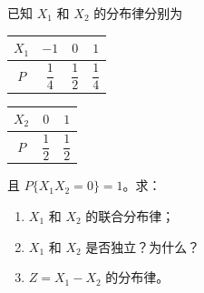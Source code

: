 \documentclass[lang=cn,11pt]{elegantbook}
\begin{document}
\begin{exercise}[联合分布的确定与独立性] \label{exer:3-3b}
已知 $X_1$ 和 $X_2$ 的分布律分别为
\begin{center}
\begin{tabular}{c|ccc}
$X_1$ & $-1$ & $0$ & $1$ \\
\midrule
$P$ & $\dfrac{1}{4}$ & $\dfrac{1}{2}$ & $\dfrac{1}{4}$
\end{tabular}
\quad
\begin{tabular}{c|cc}
$X_2$ & $0$ & $1$ \\
\midrule
$P$ & $\dfrac{1}{2}$ & $\dfrac{1}{2}$
\end{tabular}
\end{center}
且 $P\{X_1 X_2 = 0\} = 1$。求：
\begin{enumerate}
    \item[(1)] $X_1$ 和 $X_2$ 的联合分布律；
    \item[(2)] $X_1$ 和 $X_2$ 是否独立？为什么？
    \item[(3)] $Z = X_1 - X_2$ 的分布律。
\end{enumerate}
\end{exercise}
\end{document}
